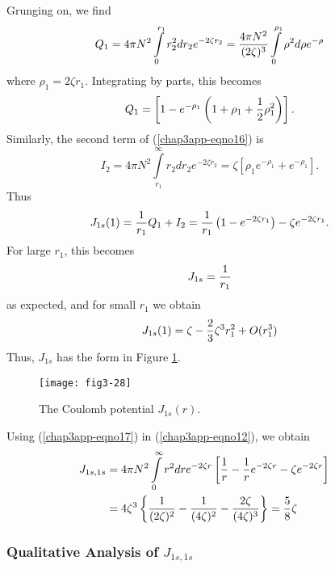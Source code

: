 Grunging on, we find
\begin{equation}
Q_1 = 4 \pi N^2 \int\limits^{r_1}_{0} r^2_2 dr_2 e^{-2 \zeta r_2} = 
{4 \pi N^2 \over (2 \zeta )^3} \int\limits^{\rho_1}_{0} \rho^2 d \rho 
e^{- \rho}
\end{equation}
where $\rho_1 = 2 \zeta r_1$.  Integrating by parts, this becomes
\begin{equation}
Q_1 = \left[ 1 - e^{- \rho_1} \left( 1 + \rho_1 + {1 \over 2} 
\rho^2_1 \right) \right] .
\end{equation}
Similarly, the second term of (\ref{chap3app-eqno16}) is
\begin{equation}
I_2 = 4 \pi N^2 \int\limits^{\infty}_{r_1} r_2 d r_2 e^{- 2 \zeta 
r_2} = \zeta \left[ \rho_1 e^{- \rho_1} + e^{- \rho_1} \right] .
\end{equation}
Thus
\begin{equation}
J_{1s} (1) = {1 \over r_1} Q_1 + I_2 = {1 \over r_1} \left( 1 - e^{-2 
\zeta r_1} \right) - \zeta e^{-2 \zeta r_1}.
\label{chap3app-eqno17}
\end{equation}
For large $r_1$, this becomes
\begin{equation}
J_{1s} = {1 \over r_1}
\end{equation}
as expected, and for small $r_1$ we obtain
\begin{equation}
J_{1s} (1) = \zeta - {2 \over 3} \zeta^3 r^2_1 + O (r^3_1 )
\end{equation}
Thus, $J_{1s}$ has the form in Figure \ref{fig3-29}.

\begin{figure}
\begin{center}
\texttt{[image: fig3-28]}
\end{center}
\caption{The Coulomb potential $J_{1s} (r)$.}
\label{fig3-29}
\end{figure}


Using (\ref{chap3app-eqno17}) in (\ref{chap3app-eqno12}), we obtain
\begin{eqnarray}
J_{1s , 1s} &= 4 \pi N^2 \int\limits^{\infty}_{0} r^2 dre^{-2 \zeta r} 
\left[ {1 \over r} - {1 \over r} e^{-2 \zeta r} - \zeta e^{-2 \zeta 
r} \right]\cr
&= 4 \zeta^3 \left\{ {1 \over (2 \zeta )^2} - {1 \over (4 
\zeta )^2} - {2 \zeta \over (4 \zeta )^3} \right\} = {5 \over 8} 
\zeta\cr
\end{eqnarray}

\medskip

\subsubsection{Qualitative Analysis of $J_{1s , 1s}$}

